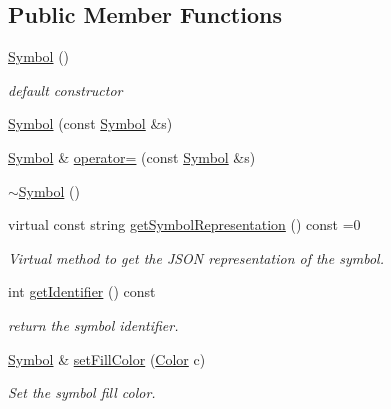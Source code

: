 \subsection*{Public Member Functions}
\begin{DoxyCompactItemize}
\item 
\hyperlink{classbridges_1_1datastructure_1_1_symbol_a6169106c021d20752abba3cd266ecfb0}{Symbol} ()
\begin{DoxyCompactList}\small\item\em default constructor \end{DoxyCompactList}\item 
\hyperlink{classbridges_1_1datastructure_1_1_symbol_ab19c9471100339ca240db841a21b800c}{Symbol} (const \hyperlink{classbridges_1_1datastructure_1_1_symbol}{Symbol} \&s)
\item 
\hyperlink{classbridges_1_1datastructure_1_1_symbol}{Symbol} \& \hyperlink{classbridges_1_1datastructure_1_1_symbol_a9a67f28b905c36cab31ca4e7b59927ee}{operator=} (const \hyperlink{classbridges_1_1datastructure_1_1_symbol}{Symbol} \&s)
\item 
\hyperlink{classbridges_1_1datastructure_1_1_symbol_a70c071bd1e73f333c006190c17efba2c}{$\sim$\+Symbol} ()
\item 
virtual const string \hyperlink{classbridges_1_1datastructure_1_1_symbol_a8044b3da559dcd9de8510ae339f126c8}{get\+Symbol\+Representation} () const =0
\begin{DoxyCompactList}\small\item\em Virtual method to get the J\+S\+ON representation of the symbol. \end{DoxyCompactList}\item 
int \hyperlink{classbridges_1_1datastructure_1_1_symbol_a58d987ff096da9ab6a8bccea85954218}{get\+Identifier} () const
\begin{DoxyCompactList}\small\item\em return the symbol identifier. \end{DoxyCompactList}\item 
\hyperlink{classbridges_1_1datastructure_1_1_symbol}{Symbol} \& \hyperlink{classbridges_1_1datastructure_1_1_symbol_a2786b248aaf84552b3ae7864f936e3da}{set\+Fill\+Color} (\hyperlink{classbridges_1_1datastructure_1_1_color}{Color} c)
\begin{DoxyCompactList}\small\item\em Set the symbol fill color. \end{DoxyCompactList}\item 

\end{DoxyCompactItemize}
